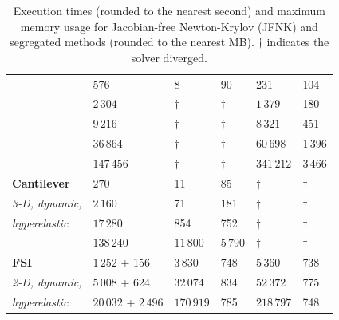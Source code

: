 \documentclass[sn-mathphys,Numbered]{sn-jnl}%
\begin{document}
\begin{table}[!htbp]
\begin{tabular}{ll|ll|ll}
				& 576 & 			$8$ & $90$ 			& 231 & 104 \\
				& $2\,304$ & 		$\dag$ & $\dag$		& $1\,379$ & 180 \\
				& $9\,216$ & 		$\dag$ & $\dag$			& $8\,321$ & 451 \\
				& $36\,864$ & 		$\dag$ & $\dag$ 		& $60\,698$ & $1\,396$ \\
				& $147\,456$ & 	$\dag$ & $\dag$ 		& $341\,212$ & $3\,466$ \\
			\hline
			\textbf{Cantilever} & $270$ & 11 & 85 		& $\dag$ & $\dag$ \\
			\emph{3-D, dynamic,} & $2\,160$ & 71 & 181 	& $\dag$ & $\dag$ \\
			\emph{hyperelastic}& $17\,280$ & 854 & 752 	& $\dag$ & $\dag$ \\
				& $138\,240$ & $11\,800$ & $5\,790$ 	& $\dag$ & $\dag$ \\
			\hline
			\textbf{FSI} & $1\,252$ + 156 & $3\,830$ & 748 				& $5\,360$ & 738 \\
			\emph{2-D, dynamic,}	& $5\,008$ + 624 & $32\,074$ & 834 	& $52\,372$ & 775 \\
			\emph{hyperelastic} & $20\,032$ + $2\,496$ & $170\,919$ & 785 	& $218\,797$ & 748 \\
			\hline
		\end{tabular}
	\caption{Execution times (rounded to the nearest second) and maximum memory usage for Jacobian-free Newton-Krylov (JFNK) and segregated methods (rounded to the nearest MB). $\dag$ indicates the solver diverged. }
	\label{tab:times_memory}
\end{table}
\end{document}
